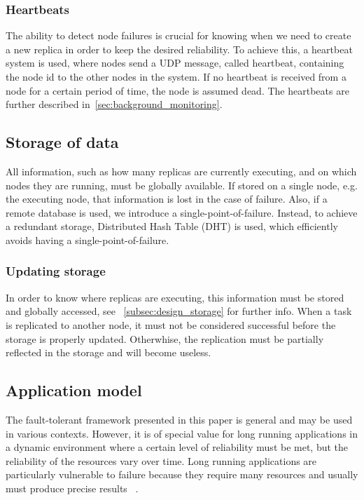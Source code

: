 \documentclass{cslthse-msc}
\begin{document}
\subsubsection{Heartbeats}
The ability to detect node failures is crucial for knowing when we need to create a new replica in order to keep the desired reliability. To achieve this, a heartbeat system is used, where nodes send a UDP message, called heartbeat, containing the node id to the other nodes in the system. If no heartbeat is received from a node for a certain period of time, the node is assumed dead. The heartbeats are further described in~\autoref{sec:background_monitoring}.

\subsection{Storage of data} \label{subsec:design_storage}
All information, such as how many replicas are currently executing, and on which nodes they are running, must be globally available. If stored on a single node, e.g. the executing node, that information is lost in the case of failure. Also, if a remote database is used, we introduce a single-point-of-failure. Instead, to achieve a redundant storage, Distributed Hash Table (DHT) is used, which efficiently avoids having a single-point-of-failure. 

\subsubsection{Updating storage}
In order to know where replicas are executing, this information must be stored and globally accessed, see ~\autoref{subsec:design_storage} for further info. When a task is replicated to another node, it must not be considered successful before the storage is properly updated. Otherwhise, the replication must be partially reflected in the storage and will become useless. %

\subsection{Application model} \label{subsec:design_app_model}
The fault-tolerant framework presented in this paper is general and may be used in various contexts. However, it is of special value for long running applications in a dynamic environment where a certain level of reliability must be met, but the reliability of the resources vary over time. Long running applications are particularly vulnerable to failure because they require many resources and usually must produce precise results ~\cite{relGridSystems}.
\end{document}
